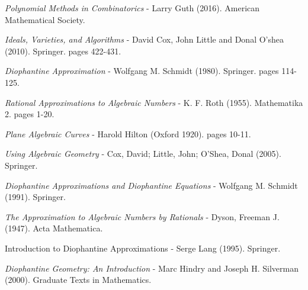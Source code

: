 \begin{thebibliography}{}

\textit{Polynomial Methods in Combinatorics} - Larry Guth (2016). American Mathematical Society.

\textit{Ideals, Varieties, and Algorithms} - David Cox, John Little and Donal O'shea (2010). Springer. pages 422-431.

\textit{Diophantine Approximation} - Wolfgang M. Schmidt (1980). Springer. pages 114-125.

\textit{Rational Approximations to Algebraic Numbers} - K. F. Roth (1955). Mathematika 2. pages 1-20.

\textit{Plane Algebraic Curves} - Harold Hilton (Oxford 1920). pages 10-11.

\textit{Using Algebraic Geometry} - Cox, David; Little, John; O'Shea, Donal (2005). Springer.

\textit{Diophantine Approximations and Diophantine Equations} - Wolfgang M. Schmidt (1991). Springer.

\textit{The Approximation to Algebraic Numbers by Rationals} - Dyson, Freeman J. (1947). Acta Mathematica.

{Introduction to Diophantine Approximations} - Serge Lang (1995). Springer.

\textit{Diophantine Geometry: An Introduction} - Marc Hindry and Joseph H. Silverman (2000). Graduate Texts in Mathematics.

\end{thebibliography}